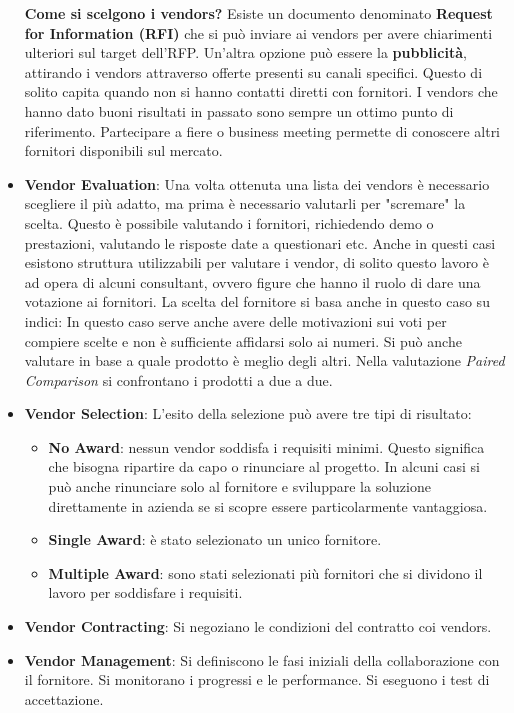 \begin{itemize}
\begin{itemize}
	\end{itemize}
	\textbf{Come si scelgono i vendors?}\newline
	Esiste un documento denominato \textbf{Request for Information (RFI)} che si può inviare ai vendors per avere chiarimenti ulteriori sul target dell'RFP. Un'altra opzione può essere la \textbf{pubblicità}, attirando i vendors attraverso offerte presenti su canali specifici. Questo di solito capita quando non si hanno contatti diretti con fornitori. I vendors che hanno dato buoni risultati in passato sono sempre un ottimo punto di riferimento. Partecipare a fiere o business meeting permette di conoscere altri fornitori disponibili sul mercato.
	\item \textbf{Vendor Evaluation}: Una volta ottenuta una lista dei vendors è necessario scegliere il più adatto, ma prima è necessario valutarli per "scremare" la scelta. Questo è possibile valutando i fornitori, richiedendo demo o prestazioni, valutando le risposte date a questionari etc.\newline
	Anche in questi casi esistono struttura utilizzabili per valutare i vendor, di solito questo lavoro è ad opera di alcuni consultant, ovvero figure che hanno il ruolo di dare una votazione ai fornitori. La scelta del fornitore si basa anche in questo caso su indici:
	In questo caso serve anche avere delle motivazioni sui voti per compiere scelte e non è sufficiente affidarsi solo ai numeri.\newline
	Si può anche valutare in base a quale prodotto è meglio degli altri. Nella valutazione \textit{Paired Comparison} si confrontano i prodotti a due a due.
	
	\item \textbf{Vendor Selection}: L'esito della selezione può avere tre tipi di risultato:
	\begin{itemize}
		\item \textbf{No Award}: nessun vendor soddisfa i requisiti minimi. Questo significa che bisogna ripartire da capo o rinunciare al progetto. In alcuni casi si può anche rinunciare solo al fornitore e sviluppare la soluzione direttamente in azienda se si scopre essere particolarmente vantaggiosa.
		\item \textbf{Single Award}: è stato selezionato un unico fornitore.
		\item \textbf{Multiple Award}: sono stati selezionati più fornitori che si dividono il lavoro per soddisfare i requisiti.
	\end{itemize}
	\item \textbf{Vendor Contracting}: Si negoziano le condizioni del contratto coi vendors.
	\item \textbf{Vendor Management}: Si definiscono le fasi iniziali della collaborazione con il fornitore. Si monitorano i progressi e le performance. Si eseguono i test di accettazione.
\end{itemize}
